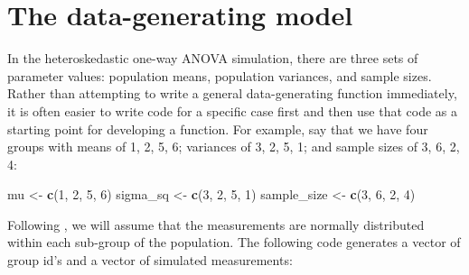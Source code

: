 \documentclass[
]{book}
\newenvironment{Shaded}{\begin{snugshade}}{\end{snugshade}}
\newcommand{\DecValTok}[1]{\textcolor[rgb]{0.00,0.00,0.81}{#1}}
\newcommand{\FunctionTok}[1]{\textcolor[rgb]{0.13,0.29,0.53}{\textbf{#1}}}
\newcommand{\NormalTok}[1]{#1}
\newcommand{\OtherTok}[1]{\textcolor[rgb]{0.56,0.35,0.01}{#1}}
\begin{document}
\section{The data-generating model}\label{the-data-generating-model}

In the heteroskedastic one-way ANOVA simulation, there are three sets of parameter values: population means, population variances, and sample sizes.
Rather than attempting to write a general data-generating function immediately, it is often easier to write code for a specific case first and then use that code as a starting point for developing a function.
For example, say that we have four groups with means of 1, 2, 5, 6; variances of 3, 2, 5, 1; and sample sizes of 3, 6, 2, 4:

\begin{Shaded}
\begin{Highlighting}[]
\NormalTok{mu }\OtherTok{\textless{}{-}} \FunctionTok{c}\NormalTok{(}\DecValTok{1}\NormalTok{, }\DecValTok{2}\NormalTok{, }\DecValTok{5}\NormalTok{, }\DecValTok{6}\NormalTok{)}
\NormalTok{sigma\_sq }\OtherTok{\textless{}{-}} \FunctionTok{c}\NormalTok{(}\DecValTok{3}\NormalTok{, }\DecValTok{2}\NormalTok{, }\DecValTok{5}\NormalTok{, }\DecValTok{1}\NormalTok{)}
\NormalTok{sample\_size }\OtherTok{\textless{}{-}} \FunctionTok{c}\NormalTok{(}\DecValTok{3}\NormalTok{, }\DecValTok{6}\NormalTok{, }\DecValTok{2}\NormalTok{, }\DecValTok{4}\NormalTok{)}
\end{Highlighting}
\end{Shaded}

Following \citet{brown1974SmallSampleBehavior}, we will assume that the measurements are normally distributed within each sub-group of the population. The following code generates a vector of group id's and a vector of simulated measurements:
\end{document}
